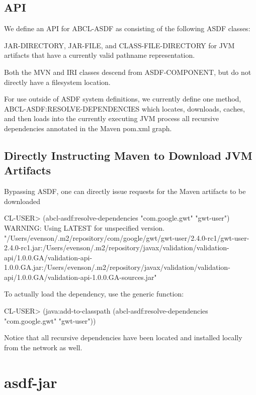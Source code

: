 \documentclass[10pt]{book}
\begin{document}
\subsection{API}

We define an API for \textsc{ABCL-ASDF} as consisting of the following
ASDF classes:

\textsc{JAR-DIRECTORY}, \textsc{JAR-FILE}, and
\textsc{CLASS-FILE-DIRECTORY} for JVM artifacts that have a currently
valid pathname representation.

Both the MVN and IRI classes descend from ASDF-COMPONENT, but do not
directly have a filesystem location.

For use outside of ASDF system definitions, we currently define one
method, \textsc{ABCL-ASDF:RESOLVE-DEPENDENCIES} which locates,
downloads, caches, and then loads into the currently executing JVM
process all recursive dependencies annotated in the Maven pom.xml
graph.

\subsection{Directly Instructing Maven to Download JVM Artifacts}

Bypassing \textsc{ASDF}, one can directly issue requests for the Maven
artifacts to be downloaded

\begin{listing-lisp}
CL-USER> (abcl-asdf:resolve-dependencies "com.google.gwt" "gwt-user")
WARNING: Using LATEST for unspecified version.
"/Users/evenson/.m2/repository/com/google/gwt/gwt-user/2.4.0-rc1/gwt-user-2.4.0-rc1.jar:/Users/evenson/.m2/repository/javax/validation/validation-api/1.0.0.GA/validation-api-1.0.0.GA.jar:/Users/evenson/.m2/repository/javax/validation/validation-api/1.0.0.GA/validation-api-1.0.0.GA-sources.jar"
\end{listing-lisp}

To actually load the dependency, use the  generic
function:

\begin{listing-lisp}
CL-USER> (java:add-to-classpath (abcl-asdf:resolve-dependencies "com.google.gwt" "gwt-user"))
\end{listing-lisp}

Notice that all recursive dependencies have been located and installed
locally from the network as well.

\section{asdf-jar}
\end{document}
